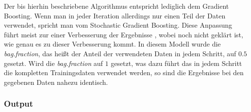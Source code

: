 Der bis hierhin beschriebene Algorithmus entspricht lediglich dem Gradient Boosting. Wenn man in jeder Iteration allerdings nur einen Teil der Daten verwendet, spricht man vom Stochastic Gradient Boosting. Diese Anpassung führt meist zur einer Verbesserung der Ergebnisse \cite{fried_additive}, wobei noch nicht geklärt ist, wie genau es zu dieser Verbesserung kommt. In diesem Modell wurde die \textit{bag.fraction}, das heißt der Anteil der verwendeten Daten in jedem Schritt, auf $0.5$ gesetzt. Wird die \textit{bag.fraction} auf $1$ gesetzt, was dazu führt das in jedem Schritt die kompletten Trainingsdaten verwendet werden, so sind die Ergebnisse bei den gegebenen Daten nahezu identisch.

\subsubsection*{Output}

